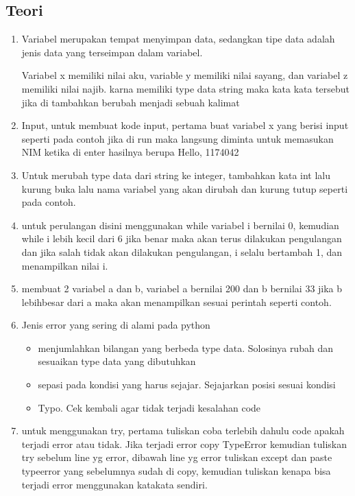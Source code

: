 \subsection{Teori}
\begin{enumerate}
	\item Variabel merupakan tempat menyimpan data, sedangkan tipe data adalah jenis data yang terseimpan dalam variabel.
	
	Variabel x memiliki nilai aku, variable y memiliki nilai sayang, dan variabel z memiliki nilai najib. karna memiliki type data string maka kata kata tersebut jika di tambahkan berubah menjadi sebuah kalimat
	
	\item Input, untuk membuat kode input, pertama buat variabel x yang berisi input seperti pada contoh jika di run maka langsung diminta untuk memasukan NIM ketika di enter hasilnya berupa Hello, 1174042
	
	
	\item Untuk merubah type data dari string ke integer, tambahkan kata int lalu kurung buka lalu nama variabel yang akan dirubah dan kurung tutup seperti pada contoh.
	
	
	\item untuk perulangan disini menggunakan while variabel i bernilai 0, kemudian while i lebih kecil dari 6 jika benar maka akan terus dilakukan pengulangan dan jika salah tidak akan dilakukan pengulangan, i selalu bertambah 1, dan menampilkan nilai i. 
	
	
	\item membuat 2 variabel a dan b, variabel a bernilai 200 dan b bernilai 33 jika b lebihbesar dari a maka akan menampilkan sesuai perintah seperti contoh.
	
	
	\item Jenis error yang sering di alami pada python
	\begin{itemize}
	    \item menjumlahkan bilangan yang berbeda type data. Solosinya rubah dan sesuaikan type data yang dibutuhkan
	    \item sepasi pada kondisi yang harus sejajar. Sejajarkan posisi sesuai kondisi
	    \item Typo. Cek kembali agar tidak terjadi kesalahan code
	\end{itemize}
	
	\item untuk menggunakan try, pertama tuliskan coba terlebih dahulu code apakah terjadi error atau tidak. Jika terjadi error copy TypeError kemudian tuliskan try sebelum line yg error, dibawah line yg error tuliskan except dan paste typeerror yang sebelumnya sudah di copy, kemudian tuliskan kenapa bisa terjadi error menggunakan katakata sendiri.
	
\end{enumerate}

